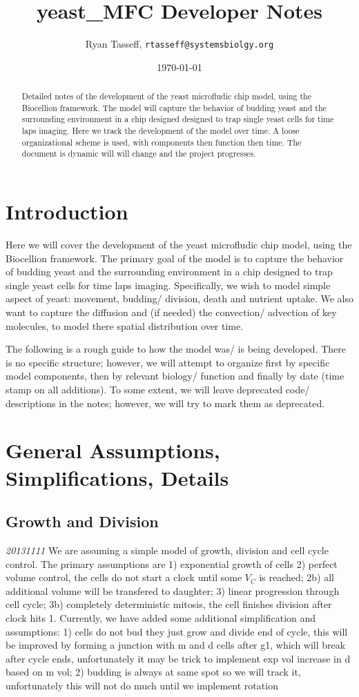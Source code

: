 \documentclass{article}
\title{yeast\_MFC Developer Notes} %
\author{Ryan Tasseff, \texttt{rtasseff@systemsbiolgy.org}}  %
\date{\today}  %
\begin{document}
\maketitle


\begin{abstract}
Detailed notes of the development of the yeast microfludic chip model,
using the Biocellion framework.
The model will capture the behavior of 
budding yeast and the surrounding environment in a chip designed 
designed to trap single yeast cells for time laps imaging.
Here we track the development of the model over time.
A loose organizational scheme is used, with components then function then time.
The document is dynamic will will change and the project progresses. \end{abstract}
 
\section{Introduction}
Here we will cover the development of the yeast microfludic chip model,
using the Biocellion framework.
The primary goal of the model is to capture the behavior of 
budding yeast and the surrounding environment in a chip  
designed to trap single yeast cells for time laps imaging.
Specifically, we wish to model simple aspect of yeast: 
movement, budding/ division, death and nutrient uptake.
We also want to capture the diffusion and (if needed) the 
convection/ advection of key molecules, 
to model there spatial distribution over time.

The following is a rough guide to how the model was/ is being developed.
There is no specific structure; however, 
we will attempt to organize first by specific model components, 
then by relevant biology/ function and finally by date (time stamp on all additions).
To some extent, we will leave deprecated code/ descriptions
in the notes; however, we will try to mark them as deprecated.

\section{General Assumptions, Simplifications, Details}
\subsection{Growth and Division}
\emph{20131111} We are assuming a simple model of growth, division and cell cycle control\cite{Charvin2009}.
The primary assumptions are 1) exponential growth of cells
2) perfect volume control,
the cells do not start a clock until some $V_C$ is reached;
2b) all additional volume will be transfered to daughter;
3) linear progression through cell cycle;
3b) completely deterministic mitosis, 
the cell finishes division after clock hits 1.
Currently, we have added some additional simplification and assumptions:
1) cells do not bud they just grow and divide end of cycle,
this will be improved by forming a junction with m and d cells after g1, 
which will break after cycle ends,
unfortunately it may be trick to implement exp vol increase in d based on m vol;
2) budding is always at same spot so we will track it,
unfortunately this will not do much until we implement rotation
\end{document}

